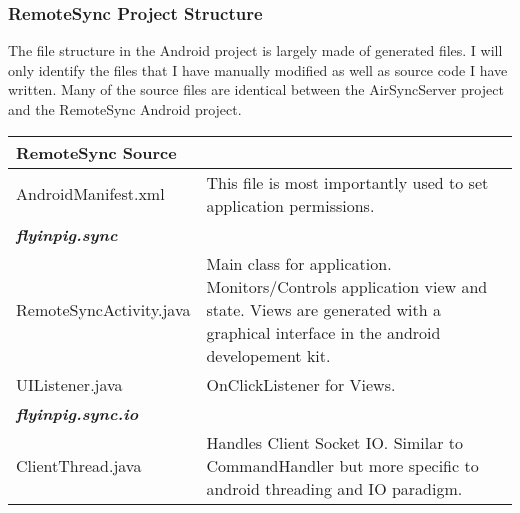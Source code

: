 \documentclass[12pt,draft]{article}
\begin{document}
\subsubsection{RemoteSync Project Structure}

The file structure in the Android project is largely made of generated files. I will only identify the files that I have manually modified as well as source code I have written. Many of the source files are identical between the AirSyncServer project and the RemoteSync Android project.
\begin{center}
\begin{tabular}{|l|p{7.5cm}|}
\hline
	\textbf{RemoteSync Source} \\
\hline 
	AndroidManifest.xml
	& This file is most importantly used to set application permissions.\\
\hline
	\emph{\textbf{flyinpig.sync}}\\
\hline
	RemoteSyncActivity.java
	& Main class for application. Monitors/Controls application view and state. Views are generated with a graphical interface in the android developement kit.\\
\hline
	UIListener.java
	& OnClickListener for Views.\\
\hline
	\emph{\textbf{flyinpig.sync.io}}\\
\hline
	ClientThread.java
	& Handles Client Socket IO. Similar to CommandHandler but more specific to android threading and IO paradigm.\\
\hline
\end{tabular}
\end{center}
\end{document}
